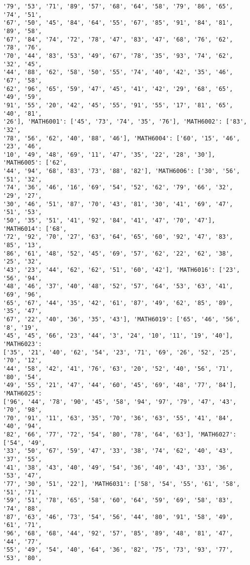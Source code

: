 \documentclass[11pt]{article}
\begin{document}
\begin{Verbatim}[commandchars=\\\{\}]
'79', '53', '71', '89', '57', '68', '64', '58', '79', '86', '65', '74', '51',
'67', '50', '45', '84', '64', '55', '67', '85', '91', '84', '81', '89', '58',
'67', '84', '74', '72', '78', '47', '83', '47', '68', '76', '62', '78', '76',
'70', '44', '83', '53', '49', '67', '78', '35', '93', '74', '62', '32', '45',
'44', '88', '62', '58', '50', '55', '74', '40', '42', '35', '46', '67', '58',
'62', '96', '65', '59', '47', '45', '41', '42', '29', '68', '65', '49', '59',
'91', '55', '20', '42', '45', '55', '91', '55', '17', '81', '65', '40', '81',
'26'], 'MATH6001': ['45', '73', '74', '35', '76'], 'MATH6002': ['83', '32',
'78', '56', '62', '40', '88', '46'], 'MATH6004': ['60', '15', '46', '23', '46',
'10', '49', '48', '69', '11', '47', '35', '22', '28', '30'], 'MATH6005': ['62',
'44', '94', '68', '83', '73', '88', '82'], 'MATH6006': ['30', '56', '51', '32',
'74', '36', '46', '16', '69', '54', '52', '62', '79', '66', '32', '29', '27',
'30', '46', '51', '87', '70', '43', '81', '30', '41', '69', '47', '51', '53',
'50', '35', '51', '41', '92', '84', '41', '47', '70', '47'], 'MATH6014': ['68',
'72', '92', '70', '27', '63', '64', '65', '60', '92', '47', '83', '85', '13',
'86', '61', '48', '52', '45', '69', '57', '62', '22', '62', '38', '25', '32',
'43', '23', '44', '62', '62', '51', '60', '42'], 'MATH6016': ['23', '56', '94',
'48', '46', '37', '40', '48', '52', '57', '64', '53', '63', '41', '69', '96',
'65', '67', '44', '35', '42', '61', '87', '49', '62', '85', '89', '35', '47',
'67', '22', '40', '36', '35', '43'], 'MATH6019': ['65', '46', '56', '8', '19',
'45', '45', '66', '23', '44', '3', '24', '10', '11', '19', '40'], 'MATH6023':
['35', '21', '40', '62', '54', '23', '71', '69', '26', '52', '25', '70', '12',
'44', '58', '42', '41', '76', '63', '20', '52', '40', '56', '71', '80', '54',
'49', '55', '21', '47', '44', '60', '45', '69', '48', '77', '84'], 'MATH6025':
['96', '44', '78', '90', '45', '58', '94', '97', '79', '47', '43', '70', '98',
'70', '91', '11', '63', '35', '70', '36', '63', '55', '41', '84', '40', '94',
'82', '66', '77', '72', '54', '80', '78', '64', '63'], 'MATH6027': ['54', '49',
'33', '50', '67', '59', '47', '33', '38', '74', '62', '40', '43', '37', '55',
'41', '38', '43', '40', '49', '54', '36', '40', '43', '33', '36', '53', '47',
'77', '30', '51', '22'], 'MATH6031': ['58', '54', '55', '61', '58', '51', '71',
'59', '51', '78', '65', '58', '60', '64', '59', '69', '58', '83', '74', '88',
'87', '63', '46', '73', '54', '56', '44', '80', '91', '58', '49', '61', '71',
'96', '68', '68', '44', '92', '57', '85', '89', '48', '81', '47', '44', '77',
'55', '49', '54', '40', '64', '36', '82', '75', '73', '93', '77', '53', '80',

\end{Verbatim}
\end{document}
